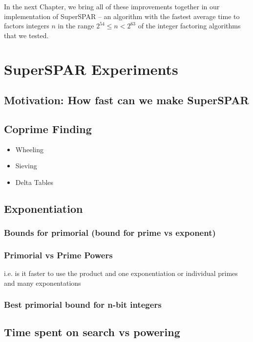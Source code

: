 \documentclass{ucalgthes1}
\theoremstyle{definition}
\begin{document}
In the next Chapter, we bring all of these improvements together in our implementation of SuperSPAR -- an algorithm with the fastest average time to factors integers $n$ in the range $2^{54} \le n < 2^{63}$ of the integer factoring algorithms that we tested.



\chapter{SuperSPAR Experiments}

\section{Motivation: How fast can we make SuperSPAR}

\bigbreak
\section{Coprime Finding}
\begin{itemize}
\item Wheeling
\item Sieving
\item Delta Tables
\end{itemize}

\bigbreak
\section{Exponentiation}
\subsection{Bounds for primorial (bound for prime vs exponent)}
\subsection{Primorial vs Prime Powers}
i.e. is it faster to use the product and one exponentiation or individual primes and many exponentations
\subsection{Best primorial bound for n-bit integers}

\section{Time spent on search vs powering}
\end{document}
